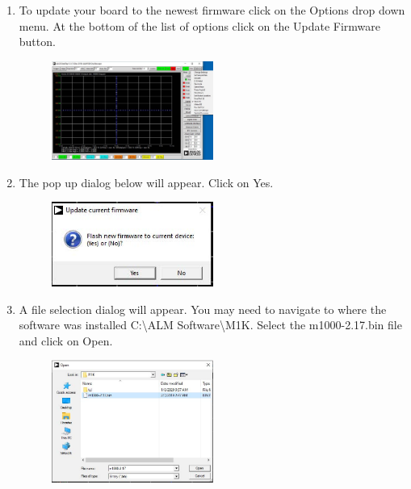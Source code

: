 \documentclass[12pt]{../manual}
\begin{document}
\begin{enumerate}
\begin{figure}[!ht]
\end{figure}
\newpage
\item To update your board to the newest firmware click on the Options drop down menu. At the bottom of the list of options click on the Update Firmware button.
\begin{figure}[!ht]
\begin{center}
\includegraphics[width=0.5\textwidth]{figures/Troubleshooting3}
\end{center}
\end{figure}
\item The pop up dialog below will appear. Click on Yes.
\begin{figure}[!ht]
\begin{center}
\includegraphics[width=0.5\textwidth]{figures/Troubleshooting4}
\end{center}
\end{figure}
\item A file selection dialog will appear. You may need to navigate to where the software was installed C:\textbackslash ALM Software\textbackslash M1K. Select the m1000-2.17.bin file and click on Open.
\begin{figure}[!ht]
\begin{center}
\includegraphics[width=0.5\textwidth]{figures/Troubleshooting5}

\end{center}
\end{figure}
\end{enumerate}
\end{document}
